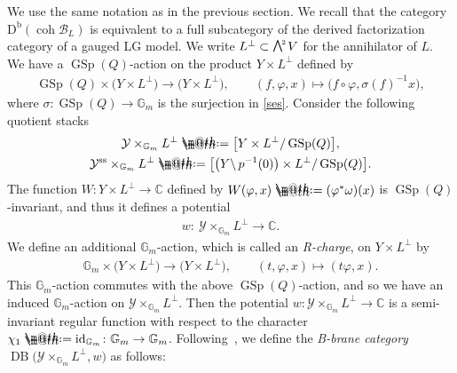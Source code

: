\documentclass[10pt,a4paper]{amsart}
\makeatletter
\newcommand*{\defeq}{\mathrel{\rlap{%
 \raisebox{0.3ex}{$\m@th\cdot$}}%
 \raisebox{-0.3ex}{$\m@th\cdot$}}%
 =}
\numberwithin{equation}{section}
\newcommand{\coh}{\operatorname{coh}}
\newcommand{\Db}{\operatorname{D^b}}
\newcommand{\id}{\operatorname{id}}
\newcommand{\GSp}{\operatorname{GSp}}
\newcommand{\stab}{\operatorname{ss}}
\newcommand{\DB}{\operatorname{DB}}
\newcommand{\cB}{\mathcal{B}}
\newcommand{\cY}{\mathcal{Y}}
\newcommand{\bC}{\mathbb{C}}
\newcommand{\bG}{\mathbb{G}}
\newcommand{\gwedge}{\raisebox{1pt}[0pt][0pt]{$\textstyle \bigwedge^{\raisebox{-1pt}[0pt][0pt]{\tiny\!$2$\,}}$}}
\makeatother
\begin{document}
 We use the same notation as in the previous section. We recall that the category $\Db(\coh \cB_L)$ is equivalent to a full subcategory of the derived factorization category of a gauged LG model. We write $L^{\perp}\subset\gwedge V$ for the annihilator of $L$. We have a $\GSp(Q)$-action on the product $Y\times L^{\perp}$ defined by
 \begin{gather*}
 \GSp(Q)\times \big(Y\times L^{\perp}\big)\to \big(Y\times L^{\perp}\big), \qquad (f, \varphi,x)\mapsto \big(f\circ \varphi, \sigma(f)^{-1}x\big),
 \end{gather*}
 where $\sigma\colon \GSp(Q)\to\bG_m$ is the surjection in \eqref{ses}. Consider the following quotient stacks
\begin{gather*}
 \cY\times_{\bG_m}L^{\perp}\defeq\big[Y\times L^{\perp}/\GSp(Q)\big],
 \\
 \cY^{\stab}\times_{\bG_m}L^{\perp}\defeq\big[\big(Y\backslash\,p^{-1}(0)\big)\times L^{\perp}/\GSp(Q)\big].
 \end{gather*}
 The function $W\colon Y\times L^{\perp}\to \bC$ defined by $W(\varphi,x)\defeq(\varphi^*\omega)(x)$ is $\GSp(Q)$-invariant, and thus it defines a potential
 \begin{gather*}
 w\colon\ \cY\times_{\bG_m}L^{\perp}\to \bC.
 \end{gather*}
 We define an additional $\bG_m$-action, which is called an {\it R-charge}, on $Y\times L^{\perp}$ by
 \begin{gather*}
 \bG_m\times \big(Y\times L^{\perp}\big)\to \big(Y\times L^{\perp}\big),\qquad
 (t, \varphi,x)\mapsto (t\varphi, x).
 \end{gather*}
This $\bG_m$-action commutes with the above $\GSp(Q)$-action, and so we have an induced $\bG_m$-action on $\cY\times_{\bG_m}L^{\perp}$. Then the potential $w\colon \cY\times_{\bG_m}L^{\perp}\to \bC$ is a semi-invariant regular function with respect to the character $\chi_1\defeq\id_{\bG_m}\colon \bG_m\to \bG_m$. Following~\cite{rs}, we define the {\it B-brane category} $\DB\big(\cY\times_{\bG_m}L^{\perp},w\big)$
as follows:
\end{document}
